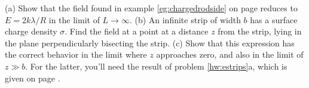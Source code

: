         (a) Show that the field found in example \ref{eg:chargedrodside} on page \pageref{eg:chargedrodside}
        reduces to $E=2k\lambda/R$ in the limit of $L\rightarrow\infty$.\hwendpart
        (b) An infinite strip of width $b$ has a surface charge density $\sigma$.
        Find the field at a point at a distance $z$ from the strip,
        lying in the plane perpendicularly bisecting the strip.
        \answercheck\hwendpart
        (c) Show that this expression has the
        correct behavior in the limit where $z$ approaches zero,
        and also in the limit of $z\gg b$. For the latter, you'll need
        the result of problem \ref{hw:estrips}a, which is given
        on page \pageref{hwans:estrips}.
